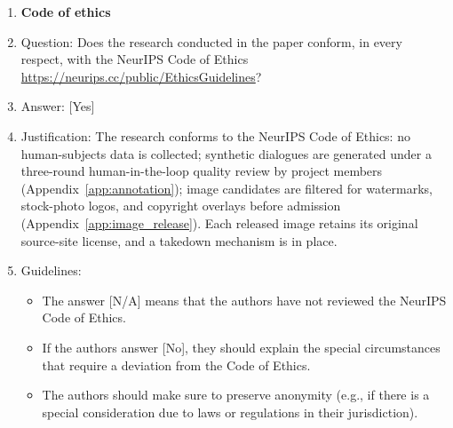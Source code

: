 \documentclass{llmxive}
\providecommand{\answerYes}[1][]{[Yes]#1}
\providecommand{\answerNo}[1][]{[No]#1}
\providecommand{\answerNA}[1][]{[N/A]#1}
\begin{document}
\begin{enumerate}
\item {\bf Code of ethics}
    \item[] Question: Does the research conducted in the paper conform, in every respect, with the NeurIPS Code of Ethics \url{https://neurips.cc/public/EthicsGuidelines}?
    \item[] Answer: \answerYes{}
    \item[] Justification: The research conforms to the NeurIPS Code of Ethics: no human-subjects data is collected; synthetic dialogues are generated under a three-round human-in-the-loop quality review by project members (Appendix~\ref{app:annotation}); image candidates are filtered for watermarks, stock-photo logos, and copyright overlays before admission (Appendix~\ref{app:image_release}). Each released image retains its original source-site license, and a takedown mechanism is in place.
    \item[] Guidelines:
    \begin{itemize}
        \item The answer \answerNA{} means that the authors have not reviewed the NeurIPS Code of Ethics.
        \item If the authors answer \answerNo, they should explain the special circumstances that require a deviation from the Code of Ethics.
        \item The authors should make sure to preserve anonymity (e.g., if there is a special consideration due to laws or regulations in their jurisdiction).
    \end{itemize}



\end{enumerate}
\end{document}
